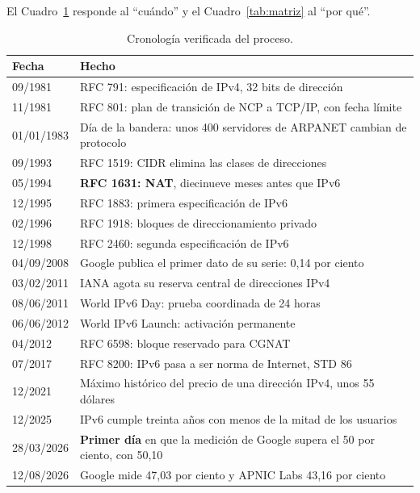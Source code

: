 \documentclass[11pt,letterpaper]{article}
\begin{document}
El Cuadro~\ref{tab:crono} responde al \enquote{cuándo} y el
Cuadro~\ref{tab:matriz} al \enquote{por qué}.

\begin{table}[ht]
  \centering
  \small
  \caption{Cronología verificada del proceso.}
  \label{tab:crono}
  \begin{tabularx}{\textwidth}{@{}l >{\raggedright\arraybackslash}X@{}}
    \toprule
    \textbf{Fecha} & \textbf{Hecho} \\
    \midrule
    09/1981 & RFC 791: especificación de IPv4, 32 bits de dirección
      \parencite{rfc791} \\
    11/1981 & RFC 801: plan de transición de NCP a TCP/IP, con fecha límite
      \parencite{rfc801} \\
    01/01/1983 & Día de la bandera: unos 400 servidores de ARPANET cambian de
      protocolo \\
    09/1993 & RFC 1519: CIDR elimina las clases de direcciones
      \parencite{rfc1519} \\
    05/1994 & \textbf{RFC 1631: NAT}, diecinueve meses antes que IPv6
      \parencite{rfc1631} \\
    12/1995 & RFC 1883: primera especificación de IPv6 \parencite{rfc1883} \\
    02/1996 & RFC 1918: bloques de direccionamiento privado
      \parencite{rfc1918} \\
    12/1998 & RFC 2460: segunda especificación de IPv6 \parencite{rfc2460} \\
    04/09/2008 & Google publica el primer dato de su serie: 0,14 por ciento
      \parencite{googlev6} \\
    03/02/2011 & IANA agota su reserva central de direcciones IPv4
      \parencite{nro2026} \\
    08/06/2011 & World IPv6 Day: prueba coordinada de 24 horas \\
    06/06/2012 & World IPv6 Launch: activación permanente \parencite{isoc2012} \\
    04/2012 & RFC 6598: bloque reservado para CGNAT \parencite{rfc6598} \\
    07/2017 & RFC 8200: IPv6 pasa a ser norma de Internet, STD 86
      \parencite{rfc8200} \\
    12/2021 & Máximo histórico del precio de una dirección IPv4, unos 55 dólares \\
    12/2025 & IPv6 cumple treinta años con menos de la mitad de los usuarios
      \parencite{register2025} \\
    28/03/2026 & \textbf{Primer día} en que la medición de Google supera el 50
      por ciento, con 50,10 \parencite{googlev6} \\
    12/08/2026 & Google mide 47,03 por ciento y APNIC Labs 43,16 por ciento
      \parencite{googlev6,apnicv6} \\
    \bottomrule
  \end{tabularx}
\end{table}
\end{document}
